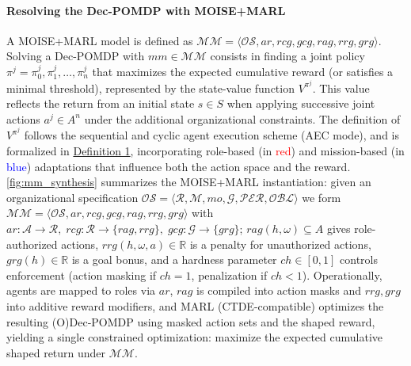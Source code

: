 \documentclass[pdflatex,sn-mathphys-num]{sn-jnl}%
\theoremstyle{thmstyleone}%
\theoremstyle{thmstyletwo}%
\theoremstyle{thmstylethree}%
\begin{document}
\paragraph*{\textbf{Resolving the Dec-POMDP with MOISE+MARL}}

A MOISE+MARL model is defined as $\mathcal{MM} = \langle \mathcal{OS}, ar, rcg, gcg, rag, rrg, grg \rangle$.
Solving a Dec-POMDP with $mm \in \mathcal{MM}$ consists in finding a joint policy $\pi^j = {\pi^j_0, \pi^j_1, \dots, \pi^j_n}$ that maximizes the expected cumulative reward (or satisfies a minimal threshold), represented by the state-value function $V^{\pi^j}$. This value reflects the return from an initial state $s \in S$ when applying successive joint actions $a^j \in A^n$ under the additional organizational constraints.
%
The definition of $V^{\pi^j}$ follows the sequential and cyclic agent execution scheme (AEC mode), and is formalized in \hyperref[eq:single_value_function]{Definition 1}, incorporating role-based (in \textcolor{red}{red}) and mission-based (in \textcolor{blue}{blue}) adaptations that influence both the action space and the reward.
\autoref{fig:mm_synthesis} summarizes the MOISE+MARL instantiation: given an organizational specification \(\mathcal{OS}=\langle\mathcal{R},\mathcal{M},mo,\mathcal{G},\mathcal{PER},\mathcal{OBL}\rangle\) we form \(\mathcal{MM}=\langle\mathcal{OS},ar,rcg,gcg,rag,rrg,grg\rangle\) with \(ar:\mathcal{A}\to\mathcal{R},\;rcg:\mathcal{R}\to\{rag,rrg\},\;gcg:\mathcal{G}\to\{grg\}\); \(rag(h,\omega)\subseteq A\) gives role-authorized actions, \(rrg(h,\omega,a)\in\mathbb{R}\) is a penalty for unauthorized actions, \(grg(h)\in\mathbb{R}\) is a goal bonus, and a hardness parameter \(ch\in[0,1]\) controls enforcement (action masking if \(ch=1\), penalization if \(ch<1\)). Operationally, agents are mapped to roles via \(ar\), \(rag\) is compiled into action masks and \(rrg,grg\) into additive reward modifiers, and MARL (CTDE-compatible) optimizes the resulting (O)Dec‑POMDP using masked action sets and the shaped reward, yielding a single constrained optimization: maximize the expected cumulative shaped return under \(\mathcal{MM}\).

\medskip
\end{document}
